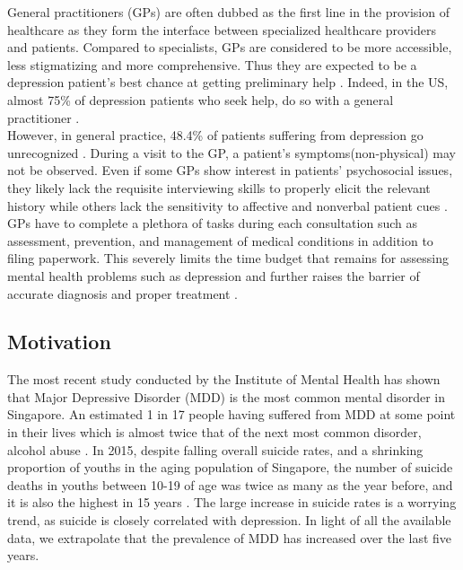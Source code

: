 \documentclass{article}
\begin{document}
	General practitioners (GPs) are often dubbed as the first line in the provision of healthcare as they form the interface between specialized healthcare providers and patients. Compared to specialists, GPs are considered to be more accessible, less stigmatizing and more comprehensive. Thus they are expected to be a depression patient's best chance at getting preliminary help \cite{rothman2003}. Indeed, in the US, almost 75\% of depression patients who seek help, do so with a general practitioner \cite{goldman1999}. \\ 

	However, in general practice, 48.4\% of patients suffering from depression go unrecognized \cite{jama2003}. During a visit to the GP, a patient's symptoms(non-physical) may not be observed. Even if some GPs show interest in patients' psychosocial issues, they likely lack the requisite interviewing skills to properly elicit the relevant history while others lack the sensitivity to affective and nonverbal patient cues \cite{badger1994}. GPs have to complete a plethora of tasks during each consultation such as assessment, prevention, and management of medical conditions in addition to filing paperwork. This severely limits the time budget that remains for assessing mental health problems such as depression and further raises the barrier of accurate diagnosis and proper treatment \cite{telford2002}. \\

	\subsection{Motivation}
	The most recent study conducted by the Institute of Mental Health has shown that Major Depressive Disorder (MDD) is the most common mental disorder in Singapore. An estimated 1 in 17 people having suffered from MDD at some point in their lives which is almost twice that of the next most common disorder, alcohol abuse \cite{annacadmedsg}. In 2015, despite falling overall suicide rates, and a shrinking proportion of youths in the aging population of Singapore, the number of suicide deaths in youths between 10-19 of age was twice as many as the year before, and it is also the highest in 15 years \cite{samaritansofsingapore2016}. The large increase in suicide rates is a worrying trend, as suicide is closely correlated with depression. In light of all the available data, we extrapolate that the prevalence of MDD has increased over the last five years. \\
\end{document}
